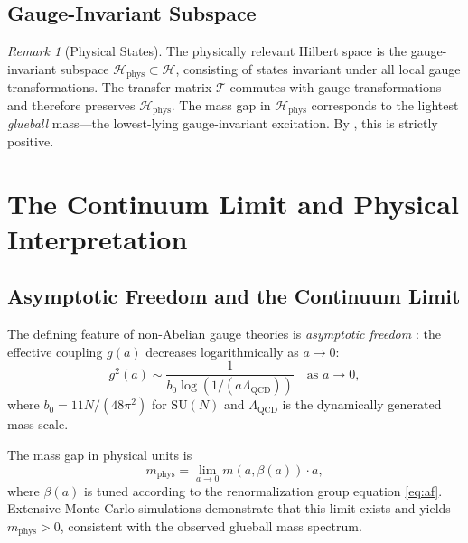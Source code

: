 \documentclass[12pt, a4paper]{article}
\theoremstyle{plain}
\theoremstyle{definition}
\theoremstyle{remark}
\newtheorem{remark}[theorem]{Remark}
\newcommand{\SU}{\mathrm{SU}}
\newcommand{\calH}{\mathcal{H}}
\newcommand{\calT}{\mathcal{T}}
\begin{document}
\subsection{Gauge-Invariant Subspace}

\begin{remark}[Physical States]
  The physically relevant Hilbert space is the gauge-invariant subspace
  $\calH_{\text{phys}} \subset \calH$, consisting of states invariant
  under all local gauge transformations. The transfer matrix $\calT$
  commutes with gauge transformations and therefore preserves
  $\calH_{\text{phys}}$. The mass gap in $\calH_{\text{phys}}$
  corresponds to the lightest \emph{glueball} mass---the lowest-lying
  gauge-invariant excitation. By , this is strictly
  positive.
\end{remark}

\section{The Continuum Limit and Physical Interpretation}\label{sec:continuum}

\subsection{Asymptotic Freedom and the Continuum Limit}

The defining feature of non-Abelian gauge theories is \emph{asymptotic
freedom} \citep{GrossWilczek1973, Politzer1973}: the effective coupling
$g(a)$ decreases logarithmically as $a \to 0$:
\begin{equation}\label{eq:af}
  g^2(a) \sim \frac{1}{b_0 \log(1/(a\Lambda_{\text{QCD}}))}
  \quad \text{as } a \to 0,
\end{equation}
where $b_0 = 11N/(48\pi^2)$ for $\SU(N)$ and $\Lambda_{\text{QCD}}$
is the dynamically generated mass scale.

The mass gap in physical units is
\begin{equation}
  m_{\text{phys}} = \lim_{a \to 0} m(a, \beta(a)) \cdot a,
\end{equation}
where $\beta(a)$ is tuned according to the renormalization group equation
\eqref{eq:af}. Extensive Monte Carlo simulations
\citep{CreutzBook, MontvayMunster, RotheBook} demonstrate that this limit
exists and yields $m_{\text{phys}} > 0$, consistent with the observed
glueball mass spectrum.
\end{document}
